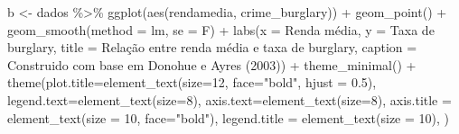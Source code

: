 \documentclass[
]{article}
\newenvironment{Shaded}{\begin{snugshade}}{\end{snugshade}}
\newcommand{\AttributeTok}[1]{\textcolor[rgb]{0.77,0.63,0.00}{#1}}
\newcommand{\DecValTok}[1]{\textcolor[rgb]{0.00,0.00,0.81}{#1}}
\newcommand{\FloatTok}[1]{\textcolor[rgb]{0.00,0.00,0.81}{#1}}
\newcommand{\FunctionTok}[1]{\textcolor[rgb]{0.00,0.00,0.00}{#1}}
\newcommand{\NormalTok}[1]{#1}
\newcommand{\OtherTok}[1]{\textcolor[rgb]{0.56,0.35,0.01}{#1}}
\newcommand{\SpecialCharTok}[1]{\textcolor[rgb]{0.00,0.00,0.00}{#1}}
\newcommand{\StringTok}[1]{\textcolor[rgb]{0.31,0.60,0.02}{#1}}
\begin{document}
\begin{Shaded}
\begin{Highlighting}[]
\NormalTok{b }\OtherTok{\textless{}{-}}\NormalTok{ dados }\SpecialCharTok{\%\textgreater{}\%} 
  \FunctionTok{ggplot}\NormalTok{(}\FunctionTok{aes}\NormalTok{(rendamedia, crime\_burglary)) }\SpecialCharTok{+}
  \FunctionTok{geom\_point}\NormalTok{() }\SpecialCharTok{+} 
  \FunctionTok{geom\_smooth}\NormalTok{(}\AttributeTok{method =} \StringTok{\textquotesingle{}lm\textquotesingle{}}\NormalTok{, }\AttributeTok{se =}\NormalTok{ F) }\SpecialCharTok{+}
  \FunctionTok{labs}\NormalTok{(}\AttributeTok{x =} \StringTok{\textquotesingle{}Renda média\textquotesingle{}}\NormalTok{,}
       \AttributeTok{y =} \StringTok{\textquotesingle{}Taxa de burglary\textquotesingle{}}\NormalTok{,}
       \AttributeTok{title =} \StringTok{\textquotesingle{}Relação entre renda média e taxa de burglary\textquotesingle{}}\NormalTok{,}
       \AttributeTok{caption =} \StringTok{\textquotesingle{}Construido com base em Donohue e Ayres (2003)\textquotesingle{}}\NormalTok{) }\SpecialCharTok{+} 
  \FunctionTok{theme\_minimal}\NormalTok{() }\SpecialCharTok{+}
  \FunctionTok{theme}\NormalTok{(}\AttributeTok{plot.title=}\FunctionTok{element\_text}\NormalTok{(}\AttributeTok{size=}\DecValTok{12}\NormalTok{, }\AttributeTok{face=}\StringTok{"bold"}\NormalTok{, }\AttributeTok{hjust =} \FloatTok{0.5}\NormalTok{),}
        \AttributeTok{legend.text=}\FunctionTok{element\_text}\NormalTok{(}\AttributeTok{size=}\DecValTok{8}\NormalTok{),}
        \AttributeTok{axis.text=}\FunctionTok{element\_text}\NormalTok{(}\AttributeTok{size=}\DecValTok{8}\NormalTok{),}
        \AttributeTok{axis.title =} \FunctionTok{element\_text}\NormalTok{(}\AttributeTok{size =} \DecValTok{10}\NormalTok{, }\AttributeTok{face=}\StringTok{"bold"}\NormalTok{),}
        \AttributeTok{legend.title =} \FunctionTok{element\_text}\NormalTok{(}\AttributeTok{size =} \DecValTok{10}\NormalTok{),}
\NormalTok{        )}


\end{Highlighting}
\end{Shaded}
\end{document}
